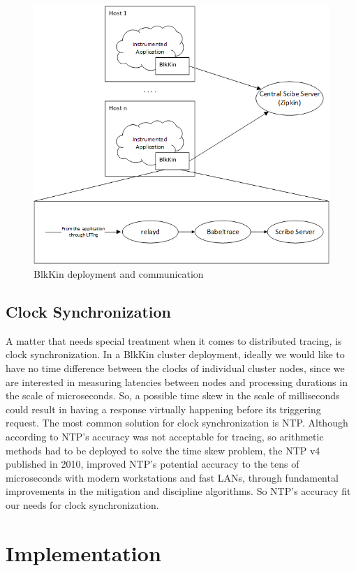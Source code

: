 \documentclass[a4paper,10pt,twocolumn]{article}
\begin{document}
\begin{figure}[h!]
  \centering
  \includegraphics[scale=0.5]{images/blkin2.png}
  \caption{BlkKin deployment and communication}
  \label{fig:blkin}
\end{figure}

\subsection{Clock Synchronization}

A matter that needs special treatment when it comes to distributed
tracing, is clock synchronization. In a BlkKin cluster deployment, ideally we
would like to have no time difference between the clocks of individual cluster
nodes, since we are interested in measuring latencies between nodes and
processing durations in the scale of microseconds. So, a possible time skew in
the scale of milliseconds could result in having a response virtually happening
before its triggering request. The most common solution for clock
synchronization is NTP. Although according to \cite{hp} NTP's accuracy was not
acceptable for tracing, so arithmetic methods had to be deployed to solve the
time skew problem, the NTP v4 published in 2010, improved NTP's potential
accuracy to the tens of microseconds with modern workstations and fast LANs,
through fundamental improvements in the mitigation and discipline algorithms.
So NTP's accuracy fit our needs for clock synchronization.

\section{Implementation} 
\end{document}
